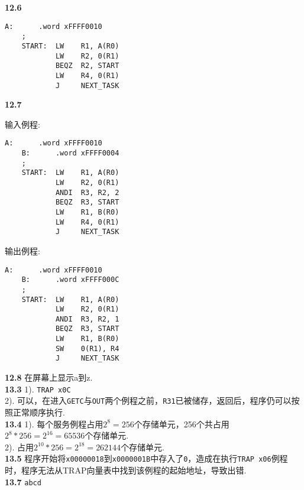 ﻿\documentclass[UTF8]{ctexart}
\begin{document}
\pagestyle{main}
\noindent\textbf{12.6}
\begin{lstlisting}[numbers = none]
    A:      .word xFFFF0010
    ;
    START:  LW    R1, A(R0)
            LW    R2, 0(R1)
            BEQZ  R2, START
            LW    R4, 0(R1)
            J     NEXT_TASK
\end{lstlisting}

\noindent\textbf{12.7}
\begin{multicols}{2}
	\indent 输入例程:
	\begin{lstlisting}[numbers = none]
    A:      .word xFFFF0010
    B:      .word xFFFF0004
    ;
    START:  LW    R1, A(R0)
            LW    R2, 0(R1)
            ANDI  R3, R2, 2
            BEQZ  R3, START
            LW    R1, B(R0)
            LW    R4, 0(R1)
            J     NEXT_TASK
\end{lstlisting}
	
	\vfill\null
	\columnbreak
	
	\indent 输出例程:
	\begin{lstlisting}[numbers = none]
    A:      .word xFFFF0010
    B:      .word xFFFF000C
    ;
    START:  LW    R1, A(R0)
            LW    R2, 0(R1)
            ANDI  R3, R2, 1
            BEQZ  R3, START
            LW    R1, B(R0)
            SW    0(R1), R4
            J     NEXT_TASK
\end{lstlisting}
\end{multicols}

\noindent\textbf{12.8} 在屏幕上显示a到z.\\

\noindent\textbf{13.3} 1). \texttt{TRAP x0C}\\
2). 可以，在进入\texttt{GETC}与\texttt{OUT}两个例程之前，\texttt{R31}已被储存，返回后，程序仍可以按照正常顺序执行.\\

\noindent\textbf{13.4} 1). 每个服务例程占用$2^8=256$个存储单元，256个共占用$2^8*256=2^{16}=65536$个存储单元.\\
2). 占用$2^{10}*256=2^{18}=262144$个存储单元.\\

\noindent\textbf{13.5} 程序开始将\texttt{x00000018}到\texttt{x0000001B}中存入了\texttt{0}，造成在执行\texttt{TRAP x06}例程时，程序无法从TRAP向量表中找到该例程的起始地址，导致出错.\\

\noindent\textbf{13.7} \texttt{abcd}\\
\end{document}
